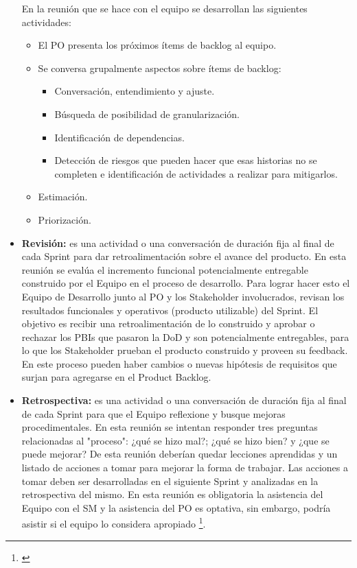\begin{itemize}
En la reunión que se hace con el equipo se desarrollan las siguientes actividades:
  \begin{itemize}
  \item{El PO presenta los próximos ítems de backlog al equipo.}
  \item{Se conversa grupalmente aspectos sobre ítems de backlog: }
    \begin{itemize}
    \item{Conversación, entendimiento y ajuste.}
    \item{Búsqueda de posibilidad de granularización.}
    \item{Identificación de dependencias.}
    \item{Detección de riesgos que pueden hacer que esas historias no se completen e identificación de actividades a realizar para mitigarlos.}
    \end{itemize}
  \item{Estimación.}
  \item{Priorización.}
  \end{itemize}

\item \textbf{Revisión:} es una actividad o una conversación de duración fija al final de cada Sprint para dar retroalimentación sobre el avance del producto. En esta reunión se evalúa el incremento funcional potencialmente entregable construido por el Equipo en el proceso de desarrollo. Para lograr hacer esto el Equipo de Desarrollo junto al PO y los Stakeholder involucrados, revisan los resultados funcionales y operativos (producto utilizable) del Sprint. El objetivo es recibir una retroalimentación de lo construido y aprobar o rechazar los PBIs que pasaron la DoD y son potencialmente entregables, para lo que los Stakeholder prueban el producto construido y proveen su feedback. En este proceso pueden haber cambios o nuevas hipótesis de requisitos que surjan para agregarse en el Product Backlog.

\item \textbf{Retrospectiva:} es una actividad o una conversación de duración fija al final de cada Sprint para que el Equipo reflexione y busque mejoras procedimentales. En esta reunión se intentan responder tres preguntas relacionadas al "proceso": ¿qué se hizo mal?; ¿qué se hizo bien? y ¿que se puede mejorar?
De esta reunión deberían quedar lecciones aprendidas y un listado de acciones a tomar para mejorar la forma de trabajar. Las acciones a tomar deben ser desarrolladas en el siguiente Sprint y analizadas en la retrospectiva del mismo.
En esta reunión es obligatoria la asistencia del Equipo con el SM y la asistencia del PO es optativa, sin embargo, podría asistir si el equipo lo considera apropiado \footnote{\cite{Martin-Alaimo-2014}}.

\end{itemize}

